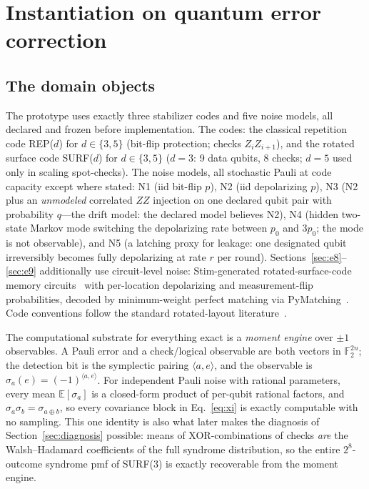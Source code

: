 \documentclass[11pt]{article}
\theoremstyle{definition}
\begin{document}
 \section{Instantiation on quantum error correction}
\label{sec:instantiation}

\subsection{The domain objects}
\label{sec:domain}

The prototype uses exactly three stabilizer codes and five noise models, all declared and frozen before implementation. The codes: the classical repetition code REP($d$) for $d \in \{3,5\}$ (bit-flip protection; checks $Z_iZ_{i+1}$), and the rotated surface code SURF($d$) for $d \in \{3,5\}$ ($d=3$: 9 data qubits, 8 checks; $d=5$ used only in scaling spot-checks). The noise models, all stochastic Pauli at code capacity except where stated: N1 (iid bit-flip $p$), N2 (iid depolarizing $p$), N3 (N2 plus an \emph{unmodeled} correlated $ZZ$ injection on one declared qubit pair with probability $q$---the drift model: the declared model believes N2), N4 (hidden two-state Markov mode switching the depolarizing rate between $p_0$ and $3p_0$; the mode is not observable), and N5 (a latching proxy for leakage: one designated qubit irreversibly becomes fully depolarizing at rate $r$ per round). Sections~\ref{sec:e8}--\ref{sec:e9} additionally use circuit-level noise: Stim-generated rotated-surface-code memory circuits~\cite{gidney2021stim} with per-location depolarizing and measurement-flip probabilities, decoded by minimum-weight perfect matching via PyMatching~\cite{higgott2022pymatching,higgott2025sparseblossom}. Code conventions follow the standard rotated-layout literature~\cite{fowler2012surfacecodes}.

The computational substrate for everything exact is a \emph{moment engine} over $\pm1$ observables. A Pauli error and a check/logical observable are both vectors in $\mathbb{F}_2^{2n}$; the detection bit is the symplectic pairing $\langle a, e\rangle$, and the observable is $\sigma_a(e) = (-1)^{\langle a,e\rangle}$. For independent Pauli noise with rational parameters, every mean $\mathbb{E}[\sigma_a]$ is a closed-form product of per-qubit rational factors, and $\sigma_a \sigma_b = \sigma_{a \oplus b}$, so every covariance block in Eq.~\eqref{eq:xi} is exactly computable with no sampling. This one identity is also what later makes the diagnosis of Section~\ref{sec:diagnosis} possible: means of XOR-combinations of checks \emph{are} the Walsh--Hadamard coefficients of the full syndrome distribution, so the entire $2^{8}$-outcome syndrome pmf of SURF(3) is exactly recoverable from the moment engine.
\end{document}
